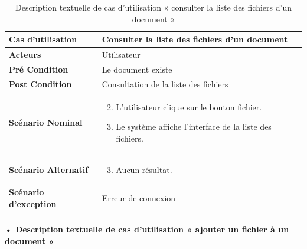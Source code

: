 \begin{longtable}{|p{5cm}|p{10cm}|}
\hline
\textbf{Cas d'utilisation}&Consulter la liste des fichiers d'un document\\
\hline
\textbf{Acteurs}&Utilisateur\\
\hline
\textbf{Pré Condition}&Le document existe\\
\hline
\textbf{Post Condition}&Consultation de la liste des fichiers\\
\hline
\textbf{Scénario Nominal}&
\vspace{-\baselineskip}
\begin{enumerate}
    \setcounter{enumi}{1}
    \item L'utilisateur clique sur le bouton fichier.
    \item Le système affiche l'interface de la liste des fichiers.
    
\end{enumerate}\\
\hline
\textbf{Scénario Alternatif}&
\vspace{-\baselineskip}
\begin{enumerate}
    \setcounter{enumi}{2}
    \item Aucun résultat.
\end{enumerate}\\
\hline
\textbf{Scénario d'exception}&Erreur de connexion\\
\hline
\caption{Description textuelle de cas d'utilisation « consulter la liste des fichiers d'un document »}
\label{tab:DescriptionTextuelleDeCasDUtilisationConsulterLaListeDesFichiersDUnDocument}
\end{longtable}

\textbf{•	Description textuelle de cas d'utilisation « ajouter un fichier à un document »}

